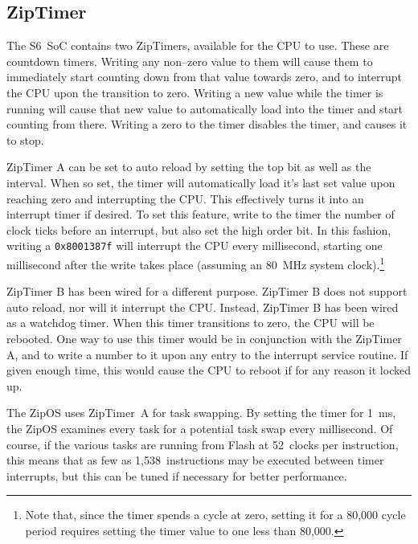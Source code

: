 \documentclass{gqtekspec}
\begin{document}
\subsection{ZipTimer}
The S6~SoC contains two ZipTimers, available for the CPU to use.  These are
countdown timers.  Writing any non--zero value to them will cause them to 
immediately start counting down from that value towards zero, and to interrupt
the CPU upon the transition to zero.  Writing a new value while the timer is
running will cause that new value to automatically load into the timer and
start counting from there.  Writing a zero to the timer disables the timer, and
causes it to stop.

ZipTimer A can be set to auto reload by setting the top bit as well as the
interval.  When so set, the timer will automatically
load it's last set value upon reaching zero and interrupting the CPU.  This
effectively turns it into an interrupt timer if desired.  To set this feature,
write to the timer the number of clock ticks before an interrupt, but also set
the high order bit.  In this fashion, writing a {\tt 0x8001387f} will interrupt
the CPU every millisecond, starting one millisecond after the write takes place
(assuming an 80~MHz system clock).\footnote{Note that, since the timer spends
a cycle at zero, setting it for a 80,000 cycle period requires setting the
timer value to one less than 80,000.}

ZipTimer B has been wired for a different purpose.  ZipTimer B does not support
auto reload, nor will it interrupt the CPU.  Instead, ZipTimer B has been wired
as a watchdog timer.  When this timer transitions to zero, the CPU will be
rebooted.  One way to use this timer would be in conjunction with the ZipTimer
A, and to write a number to it upon any entry to the interrupt service routine. 
If given enough time, this would cause the CPU to reboot if for any reason it
locked up.

The ZipOS uses ZipTimer~A for task swapping.  By setting the timer for 
1~ms, the ZipOS examines every task for a potential task swap every millisecond.
Of course, if the various tasks are running from Flash at 52~clocks per
instruction, this means that as few as 1,538~instructions may be executed
between timer interrupts, but this can be tuned if necessary for better
performance.
\end{document}
